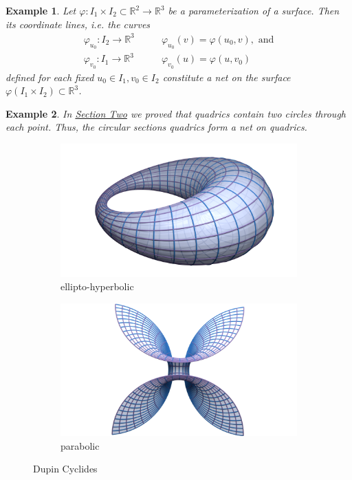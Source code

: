 \documentclass[12pt,a4paper]{article}
\theoremstyle{BoldTopSpacing}
\theoremstyle{BoldTopSpacing}
\theoremstyle{BoldTopSpacing}
\theoremstyle{BoldTopBottomSpacing}
\theoremstyle{BoldTopSpacing}
\theoremstyle{BoldTopBottomSpacing}
\newtheorem{example}{Example}[section]
\theoremstyle{remark}
\begin{document}
\begin{example}
\label{ex:coordinate-lines-form-net-on-surfaces}
Let $\varphi : I_{1} \times I_{2} \subset \mathbb{R}^2 \to \mathbb{R}^3$ be a parameterization of a surface. Then its
coordinate lines, i.e. the curves
\begin{align*}
    \varphi_{u_0} : I_{2} \to \mathbb{R}^3 &\quad \quad \varphi_{u_0}(v) = \varphi(u_0, v), \text{ and} \\
    \varphi_{v_0} : I_{1} \to \mathbb{R}^3 &\quad \quad \varphi_{v_0}(u) = \varphi(u, v_0)
\end{align*}
defined for each fixed $u_{0} \in I_1, v_{0} \in I_2$ constitute a net on the surface $\varphi\left( I_1 \times I_{2}
\right) \subset \mathbb{R}^3$.
\end{example}

\begin{example}
\label{ex:circular-sections-form-nets-on-quadrics}
In \hyperref[sec:circular-sections-of-quadrics]{Section Two} we proved that quadrics contain two circles through each point. Thus, the circular sections quadrics form a net on quadrics.
\end{example}

\begin{figure}[H]
  \begin{subfigure}[b]{0.5\textwidth}
    \includegraphics[width=\textwidth]{Dupin-net.png}
    \caption{ellipto-hyperbolic}
    \label{fig:ellipto-hyperbolic-cyclides}
  \end{subfigure}
  \hfill
  \begin{subfigure}[b]{0.5\textwidth}
    \includegraphics[width=\textwidth]{Dupin-net-2.png}
    \caption{parabolic}
    \label{fig:parabolic-cyclides}
  \end{subfigure}
  \caption{Dupin Cyclides}
\end{figure}
\end{document}
